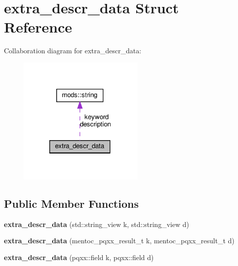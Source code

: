 \hypertarget{structextra__descr__data}{}\section{extra\+\_\+descr\+\_\+data Struct Reference}
\label{structextra__descr__data}


Collaboration diagram for extra\+\_\+descr\+\_\+data\+:
\nopagebreak
\begin{figure}[H]
\begin{center}
\leavevmode
\includegraphics[width=174pt]{structextra__descr__data__coll__graph}
\end{center}
\end{figure}
\subsection*{Public Member Functions}
\begin{DoxyCompactItemize}
\item 
\mbox{\label{structextra__descr__data_aee3a0db7a8998d8cce2e96477b3c29e5}} 
{\bfseries extra\+\_\+descr\+\_\+data} (std\+::string\+\_\+view k, std\+::string\+\_\+view d)
\item 
\mbox{\label{structextra__descr__data_ac51e1a1443cfe4be5482da478b5f20b8}} 
{\bfseries extra\+\_\+descr\+\_\+data} (mentoc\+\_\+pqxx\+\_\+result\+\_\+t k, mentoc\+\_\+pqxx\+\_\+result\+\_\+t d)
\item 
\mbox{\label{structextra__descr__data_a0796320be1877f9398a20495f782a1db}} 
{\bfseries extra\+\_\+descr\+\_\+data} (pqxx\+::field k, pqxx\+::field d)
\end{DoxyCompactItemize}
